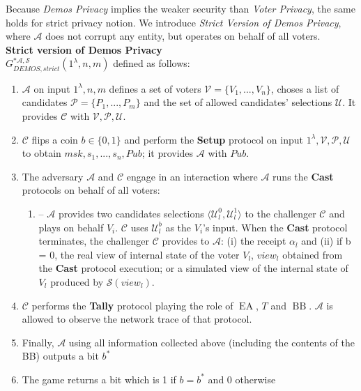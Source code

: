 \documentclass[12pt]{article}
\DeclareMathOperator{\ea}{EA}
\DeclareMathOperator{\bb}{BB}
\begin{document}
 Because \textit{Demos Privacy} implies the weaker security than \textit{Voter Privacy}, the same holds for strict privacy notion. We introduce \textit{Strict Version of Demos Privacy}, where $\mathcal{A}$ does not corrupt any entity, but operates on behalf of all voters. \\
   
 \textbf{Strict version of Demos Privacy}\\
 $G_{DEMOS,strict}^{*\mathcal{A}, \mathcal{S}}(1^{\lambda},n,m)$ defined as follows:\\
\begin{enumerate}
\item $\mathcal{A}$ on input $1^{\lambda},n,m$ defines a set of voters  $\mathcal{V} = \{V_1,...,V_n\}$, choses a list of candidates  $\mathcal{P} = \{P_1,...,P_m\}$ and the set of allowed candidates' selections $\mathcal{U}$.  It provides $\mathcal{C}$ with $\mathcal{V}, \mathcal{P}, \mathcal{U}$.
\item $\mathcal{C}$ flips a coin $b\in \{0,1\}$ and perform the \textbf{Setup} protocol on input $1^{\lambda},\mathcal{V}, \mathcal{P}, \mathcal{U}$ to obtain $msk,s_1,...,s_n, Pub$; it provides  $\mathcal{A}$ with $Pub$. 
\item The adversary $\mathcal{A}$  and $\mathcal{C}$ engage in an interaction where $\mathcal{A}$ runs the \textbf{Cast} protocols on behalf of all voters:
\begin{enumerate}
\item[] --  $\mathcal{A}$ provides two candidates selections $\langle \mathcal{U}^0_l , \mathcal{U}^1_l \rangle$ to the challenger $\mathcal{C}$ and plays on behalf $V_i$. $\mathcal{C}$ uses $\mathcal{U}^b_l$ as the $V_i$'s input. When the  \textbf{Cast} protocol terminates, the challenger  $\mathcal{C}$ provides to $\mathcal{A}$: (i) the receipt $\alpha_l$ and (ii) if b = 0, the real view of internal state of the voter $V_l$, $view_l$ obtained from the \textbf{Cast} protocol execution; or  a simulated view of the internal state of $V_l$ produced by $\mathcal{S}(view_l)$.
\end{enumerate}
\item $\mathcal{C}$ performs the  \textbf{Tally} protocol playing the role of $\ea$, $T$  and $\bb$. $\mathcal{A}$ is allowed to observe the network trace of that protocol. 
\item Finally, $\mathcal{A}$ using all information collected above (including the contents of the BB) outputs a bit $b^*$
\item  The game returns a bit which is 1 if $b = b^*$ and 0 otherwise
\end{enumerate}
\end{document}
